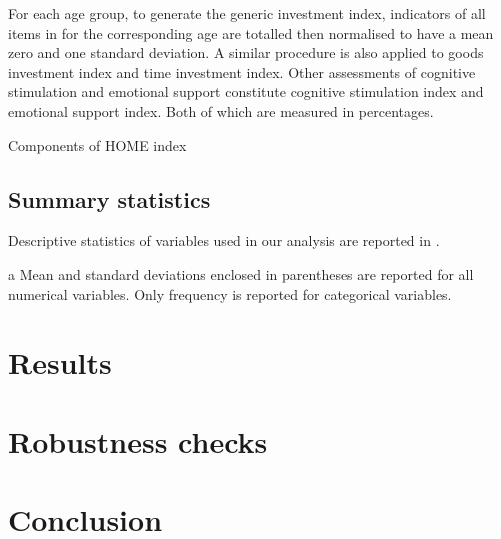 \documentclass[]{article}
\begin{document}
For each age group, to generate the generic investment index, indicators of all items in  for the corresponding age are totalled then normalised to have a mean zero and one standard deviation. A similar procedure is also applied to goods investment index and time investment index. Other assessments of cognitive stimulation and emotional support constitute cognitive stimulation index and emotional support index. Both of which are measured in percentages.

\begin{table}
	\centering
	\setlength{\extrarowheight}{0.2em}
	\caption{Components of HOME index}	
	
	\label{table:2}
\end{table}  

\subsection{Summary statistics}
Descriptive statistics of variables used in our analysis are reported in . 

\begin{ThreePartTable}
	\centering
	\setlength{\extrarowheight}{0.2em}
	\begin{TableNotes}\footnotesize
		\item[a] Mean and standard deviations enclosed in parentheses are reported for all numerical variables. Only frequency is reported for categorical variables.
	\end{TableNotes}
	
\end{ThreePartTable}



\section{Results}





\section{Robustness checks}





\section{Conclusion}

\pagebreak



\end{document}
